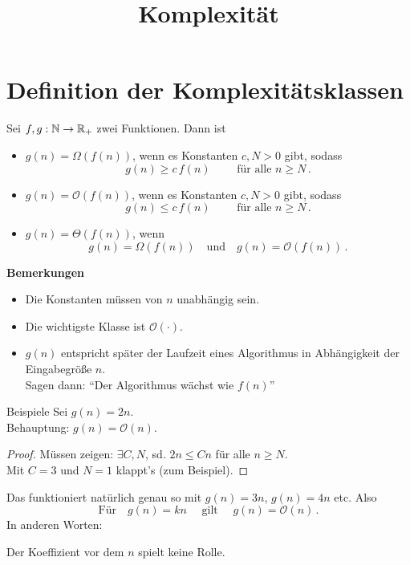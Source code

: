 \documentclass[aspectratio=169,handout]{beamer}
\title{Komplexität}
\begin{document}
\begin{frame}[fragile]
  \maketitle
\end{frame}

\section{Definition der Komplexitätsklassen}
\begin{frame}[fragile]
  Sei $f,g : \mathbb{N} \rightarrow \mathbb{R}_{+}$ zwei Funktionen. Dann ist
  \pause
  \begin{itemize}
  \item $g(n) = \Omega(f(n))$, wenn es Konstanten $c, N > 0$ gibt, sodass
    \[
      g(n) \ge c\, f(n) \qquad \text{ für alle } n \ge N \,.
    \]
    \pause
  \item $g(n) = \mathcal{O}(f(n))$, wenn es Konstanten $c, N > 0$ gibt, sodass
    \[
      g(n) \le c\, f(n) \qquad \text{ für alle } n \ge N \,.
    \]
    \pause
  \item $g(n) = \Theta(f(n))$, wenn
    \[
      g(n) = \Omega(f(n)) \quad \text{und} \quad g(n) = \mathcal{O}(f(n)) \,.
    \]
  \end{itemize}
\end{frame}

\begin{frame}
  \textbf{Bemerkungen}
  \begin{itemize}
  \item Die Konstanten müssen von $n$ unabhängig sein.
  \item Die wichtigste Klasse ist $\mathcal{O}(\cdot)$.
  \item $g(n)$ entspricht später der Laufzeit eines Algorithmus in Abhängigkeit der Eingabegröße $n$.\\
    Sagen dann: ``Der Algorithmus wächst wie $f(n)$''
   \end{itemize}
\end{frame}

\begin{frame}{Beispiele}
  Sei $g(n) = 2n$.\\ Behauptung: $g(n) = \mathcal{O}(n)$.\\[2ex]
  \pause
  \begin{proof}
    Müssen zeigen: $\exists C, N$, sd. $2n \le Cn$ für alle $n \ge N$.\\[2ex]
    \pause
    Mit $C = 3$ und $N = 1$ klappt's (zum Beispiel).
  \end{proof}
  \pause
  Das funktioniert natürlich genau so mit $g(n) = 3n$, $g(n) = 4n$ etc. Also
  \[
    \text{Für} \quad g(n) = kn \quad \text{ gilt } \quad g(n) = \mathcal{O}(n)\,.
  \]
  In anderen Worten:
  \begin{center}
    Der Koeffizient vor dem $n$ spielt keine Rolle.
  \end{center}
\end{frame}
\end{document}
